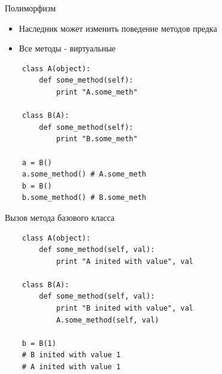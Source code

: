 \documentclass{article}
\begin{document}
\newpage

\begin{center} Полиморфизм \end{center}
\begin{itemize}
    \item Наследник может изменить поведение методов предка
    \item Все методы - виртуальные
\end{itemize}
{
\Large
\vspace{15pt}
\begin{lstlisting}
    class A(object):
        def some_method(self):
            print "A.some_meth"

    class B(A):
        def some_method(self):
            print "B.some_meth"

    a = B() 
    a.some_method() # A.some_meth
    b = B() 
    b.some_method() # B.some_meth

\end{lstlisting}
}
\newpage

\begin{center} Вызов метода базового класса \end{center}
{
\Large
\vspace{15pt}
\begin{lstlisting}
    class A(object):
        def some_method(self, val):
            print "A inited with value", val

    class B(A):
        def some_method(self, val):
            print "B inited with value", val
            A.some_method(self, val)

    b = B(1) 
    # B inited with value 1
    # A inited with value 1
\end{lstlisting}
}
\newpage
\end{document}
